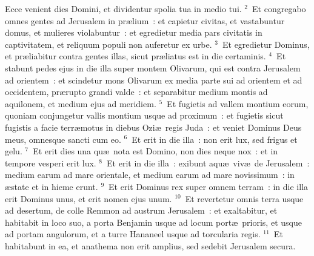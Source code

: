 \bchapter
\lettrine[lines=3,image=true,loversize=0.05,lraise=-0.03]{E}{}cce venient dies Domini, et dividentur spolia tua in medio tui.
${}^{2}$~Et congregabo omnes gentes ad Jerusalem in pr\ae lium~: et capietur civitas, et vastabuntur domus, et mulieres violabuntur~: et egredietur media pars civitatis in captivitatem, et reliquum populi non auferetur ex urbe.
${}^{3}$~Et egredietur Dominus, et pr\ae liabitur contra gentes illas, sicut pr\ae liatus est in die certaminis.
${}^{4}$~Et stabunt pedes ejus in die illa super montem Olivarum, qui est contra Jerusalem ad orientem~: et scindetur mons Olivarum ex media parte sui ad orientem et ad occidentem, pr\ae rupto grandi valde~: et separabitur medium montis ad aquilonem, et medium ejus ad meridiem.
${}^{5}$~Et fugietis ad vallem montium eorum, quoniam conjungetur vallis montium usque ad proximum~: et fugietis sicut fugistis a facie terr\ae motus in diebus Ozi\ae\ regis Juda~: et veniet Dominus Deus meus, omnesque sancti cum eo.
${}^{6}$~Et erit in die illa~: non erit lux, sed frigus et gelu.
${}^{7}$~Et erit dies una qu\ae\ nota est Domino, non dies neque nox~: et in tempore vesperi erit lux.
${}^{8}$~Et erit in die illa~: exibunt aqu\ae\ viv\ae\ de Jerusalem~: medium earum ad mare orientale, et medium earum ad mare novissimum~: in \ae state et in hieme erunt.
${}^{9}$~Et erit Dominus rex super omnem terram~: in die illa erit Dominus unus, et erit nomen ejus unum.
${}^{10}$~Et revertetur omnis terra usque ad desertum, de colle Remmon ad austrum Jerusalem~: et exaltabitur, et habitabit in loco suo, a porta Benjamin usque ad locum port\ae\ prioris, et usque ad portam angulorum, et a turre Hananeel usque ad torcularia regis.
${}^{11}$~Et habitabunt in ea, et anathema non erit amplius, sed sedebit Jerusalem secura.



